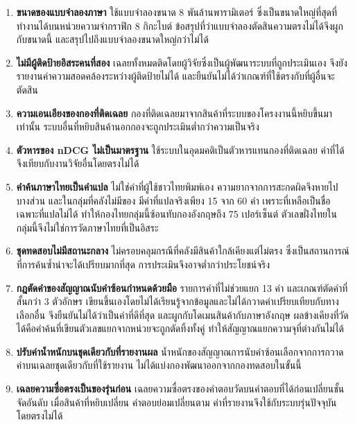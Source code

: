 \begin{enumerate}[label=\arabic*)]
    \item \textbf{ขนาดของแบบจำลองภาษา} ใช้แบบจำลองขนาด 8 พันล้านพารามิเตอร์ ซึ่งเป็นขนาดใหญ่ที่สุดที่ทำงานได้บนหน่วยความจำกราฟิก 8 กิกะไบต์ ข้อสรุปที่ว่าแบบจำลองตัดสินความตรงไม่ได้จึงผูกกับขนาดนี้ และสรุปไปถึงแบบจำลองขนาดใหญ่กว่าไม่ได้
    \item \textbf{ไม่มีผู้ติดป้ายอิสระคนที่สอง} เฉลยทั้งหมดติดโดยผู้วิจัยซึ่งเป็นผู้พัฒนาระบบที่ถูกประเมินเอง จึงยังรายงานค่าความสอดคล้องระหว่างผู้ติดป้ายไม่ได้ และยืนยันไม่ได้ว่าเกณฑ์ที่ใช้ตรงกับที่ผู้อื่นจะตัดสิน
    \item \textbf{ความเอนเอียงของกองที่ติดเฉลย} กองที่ติดเฉลยมาจากสินค้าที่ระบบของโครงงานนี้หยิบขึ้นมาเท่านั้น ระบบอื่นที่หยิบสินค้านอกกองจะถูกประเมินต่ำกว่าความเป็นจริง
    \item \textbf{ตัวหารของ nDCG ไม่เป็นมาตรฐาน} ใช้ระบบในอุดมคติเป็นตัวหารแทนกองที่ติดเฉลย ค่าที่ได้จึงเทียบกับงานวิจัยอื่นโดยตรงไม่ได้
    \item \textbf{คำค้นภาษาไทยเป็นคำแปล} ไม่ใช่คำที่ผู้ใช้ชาวไทยพิมพ์เอง ความยากจากการสะกดผิดจึงหายไปบางส่วน และในกลุ่มที่คลังไม่มีของ มีคำที่แปลจริงเพียง 15 จาก 60 คำ เพราะที่เหลือเป็นชื่อเฉพาะที่แปลไม่ได้ ทำให้กองไทยกลุ่มนี้ซ้อนทับกองอังกฤษถึง 75 เปอร์เซ็นต์ ตัวเลขฝั่งไทยในกลุ่มนี้จึงไม่ใช่การวัดภาษาไทยที่เป็นอิสระ
    \item \textbf{ชุดทดสอบไม่มีสถานะกลาง} ไม่ครอบคลุมกรณีที่คลังมีสินค้าใกล้เคียงแต่ไม่ตรง ซึ่งเป็นสถานการณ์ที่การค้นซ้ำน่าจะได้เปรียบมากที่สุด การประเมินจึงอาจต่ำกว่าประโยชน์จริง
    \item \textbf{กฎตัดคำของสัญญาณนับคำซ้อนกำหนดด้วยมือ} รายการคำที่ไม่ช่วยแยก 13 คำ และเกณฑ์ตัดคำที่สั้นกว่า 3 ตัวอักษร เขียนขึ้นเองโดยไม่ได้เรียนรู้จากข้อมูลและไม่ได้กวาดค่าเปรียบเทียบกับทางเลือกอื่น จึงยืนยันไม่ได้ว่าเป็นค่าที่ดีที่สุด และผูกกับโดเมนสินค้ากับภาษาอังกฤษ ผลข้างเคียงที่วัดได้คือคำค้นที่เขียนตัวเลขแยกจากหน่วยจะถูกตัดทิ้งทั้งคู่ ทำให้สัญญาณแยกความจุที่ต่างกันไม่ได้
    \item \textbf{ปรับค่าน้ำหนักบนชุดเดียวกับที่รายงานผล} น้ำหนักของสัญญาณการนับคำซ้อนเลือกจากการกวาดค่าบนเฉลยชุดเดียวกับที่ใช้รายงาน ไม่ได้แบ่งกองพัฒนาออกจากกองทดสอบในขั้นนี้
    \item \textbf{เฉลยความซื่อตรงเป็นของรุ่นก่อน} เฉลยความซื่อตรงของคำตอบวัดบนคำตอบที่ได้ก่อนเปลี่ยนชั้นจัดอันดับ เมื่อสินค้าที่หยิบเปลี่ยน คำตอบย่อมเปลี่ยนตาม ค่าที่รายงานจึงใช้กับระบบรุ่นปัจจุบันโดยตรงไม่ได้
\end{enumerate}

